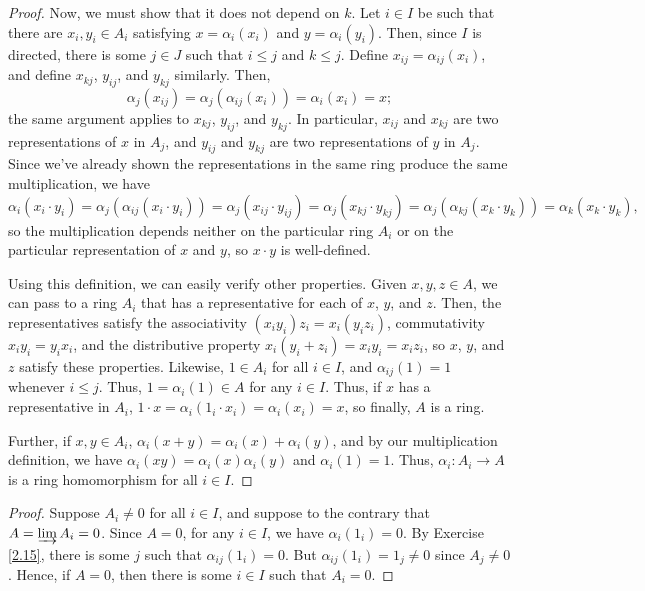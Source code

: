 \begin{proof}
Now, we must show that it does not depend on $k$. Let $i \in I$ be such that there are $x_i, y_i \in A_i$ satisfying 
$x = \alpha_i(x_i)$ and $y = \alpha_i(y_i)$. Then, since $I$ is directed, there is some $j \in J$ such that $i \le j$ and $k \le j$. Define $x_{ij} = \alpha_{ij}(x_i)$, and define $x_{kj}$, $y_{ij}$, and $y_{kj}$ similarly.
Then, 
$$\alpha_j(x_{ij}) = \alpha_{j}(\alpha_{ij}(x_i)) = \alpha_i(x_i) = x;$$
the same argument applies to $x_{kj}$, $y_{ij}$, and $y_{kj}$. In particular, $x_{ij}$ and $x_{kj}$ are two representations of $x$ in $A_j$, and $y_{ij}$ and $y_{kj}$ are two representations of $y$
in $A_j$. Since we've already shown the representations in the same ring produce the same multiplication, we have 
$$\alpha_i(x_i \cdot y_i) = \alpha_j(\alpha_{ij}(x_i \cdot y_i)) = \alpha_j(x_{ij} \cdot y_{ij}) = \alpha_j(x_{kj} \cdot y_{kj}) = \alpha_j(\alpha_{kj}(x_k \cdot y_k)) = \alpha_k(x_k \cdot y_k),$$
so the multiplication depends neither on the particular ring $A_i$ or on the particular representation of $x$ and $y$, so $x \cdot y$ is well-defined.

Using this definition, we can easily verify other properties. Given $x,y,z \in A$, we can pass to a ring $A_i$ that has a representative for each of $x$, $y$, and $z$. Then, the representatives
satisfy the associativity $(x_iy_i)z_i = x_i(y_iz_i)$, commutativity $x_iy_i = y_ix_i$, and the distributive property $x_i(y_i + z_i) = x_iy_i = x_iz_i$, so $x$, $y$, and $z$ satisfy these properties.
Likewise, $1 \in A_i$ for all $i \in I$, and $\alpha_{ij}(1) = 1$ whenever $i \le j$. Thus, $1 = \alpha_i(1) \in A$ for any $i \in I$. Thus, if $x$ has a representative in $A_i$, $1 \cdot x = \alpha_i(1_i \cdot x_i) = \alpha_i(x_i) = x$,
so finally, $A$ is a ring.

Further, if $x,y \in A_i$, $\alpha_i(x + y) = \alpha_i(x) + \alpha_i(y)$, and by our multiplication definition, we have $\alpha_i(xy) = \alpha_i(x)\alpha_i(y)$ and $\alpha_i(1) = 1$. Thus,
$\alpha_i : A_i \to A$ is a ring homomorphism for all $i \in I$.
\end{proof}

\begin{proof}
Suppose $A_i \neq 0$ for all $i \in I$, and suppose to the contrary that $A = \varinjlim A_i = 0$. Since $A = 0$, for any $i \in I$, we have $\alpha_i(1_i) = 0$. By Exercise \ref{2.15},
there is some $j$ such that $\alpha_{ij}(1_i) = 0$. But $\alpha_{ij}(1_i) = 1_j \neq 0$ since $A_j \neq 0$. Hence, if $A = 0$, then there is some $i \in I$ such that $A_i = 0$.
\end{proof}

